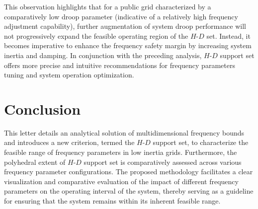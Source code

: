\documentclass[lettersize,journal]{IEEEtran}
\begin{document}
This observation highlights that for a public grid characterized by a comparatively low droop parameter (indicative of a relatively high frequency adjustment capability), further augmentation of system droop performance will not progressively expand the feasible operating region of the $H$-$D$ set. Instead, it becomes imperative to enhance the frequency safety margin by increasing system inertia and damping. In conjunction with the preceding analysis, $H$-$D$ support set offers more precise and intuitive recommendations for frequency parameters tuning and system operation optimization.


\section{Conclusion}

This letter details an analytical solution of multidimensional frequency bounds and introduces a new criterion, termed the $H$-$D$ support set, to characterize the feasible range of frequency parameters in low inertia grids. Furthermore, the polyhedral extent of $H$-$D$ support set is comparatively assessed across various frequency parameter configurations. The proposed methodology facilitates a clear visualization and comparative evaluation of the impact of different frequency parameters on the operating interval of the system, thereby serving as a guideline for ensuring that the system remains within its inherent feasible range.



\end{document}
